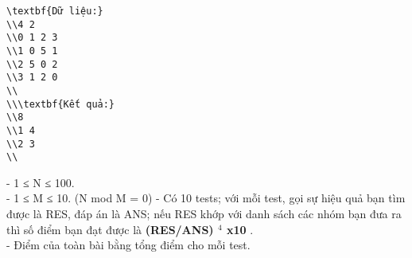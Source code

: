 \begin{verbatim}
\textbf{Dữ liệu:}
\\4 2
\\0 1 2 3
\\1 0 5 1
\\2 5 0 2
\\3 1 2 0
\\
\\\textbf{Kết quả:}
\\8
\\1 4
\\2 3
\\\end{verbatim}
- 1 ≤ N ≤ 100.   
\\   - 1 ≤ M ≤ 10. (N mod M = 0)
- Có 10 tests; với mỗi test, gọi sự hiệu quả bạn tìm được là RES, đáp án là ANS; nếu RES khớp với danh sách các nhóm bạn đưa ra thì số điểm bạn đạt được là   \textbf{    (RES/ANS)    $^     4    $    x10   }   .   
\\   - Điểm của toàn bài bằng tổng điểm cho mỗi test.